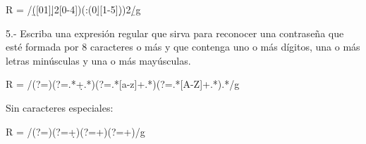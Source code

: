 \documentclass{article}
\begin{document}
\begin{spverbatim}
R = /\b([01]\d|2[0-4])(:(0\d|[1-5]\d)){2}\b/g
\end{spverbatim}
\vspace{1em}

5.- Escriba una expresión regular que sirva para reconocer una contraseña que
esté formada por 8 caracteres o más y que contenga uno o más dígitos, una o
más letras minúsculas y una o más mayúsculas.

\begin{spverbatim}
R = /(?=)(?=.*\d+.*)(?=.*[a-z]+.*)(?=.*[A-Z]+.*).*/g
\end{spverbatim}
\vspace{1em}

Sin caracteres especiales:

\begin{spverbatim}
R = /(?=)(?=\w*\d+\w*)(?=\w*[a-zA-Z]+\w*)(?=\w*[A-Z]+\w*)\w*/g
\end{spverbatim}
\end{document}
